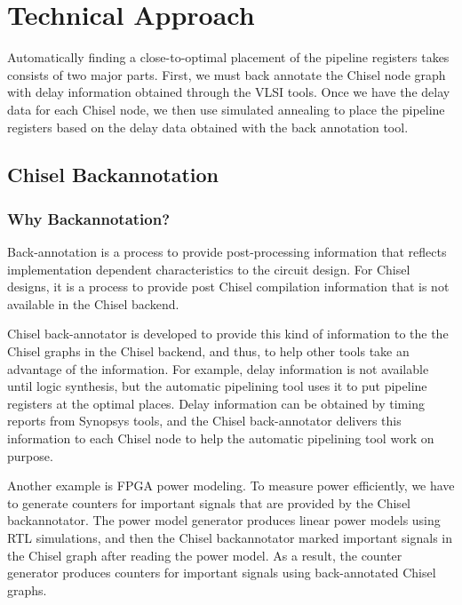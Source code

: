 \section{Technical Approach}
Automatically finding a close-to-optimal placement of the pipeline registers takes consists of two major parts. First, we must back annotate the Chisel node graph with delay information obtained through the VLSI tools. Once we have the delay data for each Chisel node, we then use simulated annealing to place the pipeline registers based on the delay data obtained with the back annotation tool.

\subsection{Chisel Backannotation}
\subsubsection{Why Backannotation?}
Back-annotation is a process to provide post-processing information that reflects implementation dependent characteristics to the circuit design. For Chisel designs, it is a process to provide post Chisel compilation information that is not available in the Chisel backend. 

Chisel back-annotator is developed to provide this kind of information to the the Chisel graphs in the Chisel backend, and thus, to help other tools take an advantage of the information. For example, delay information is not available until logic synthesis, but the automatic pipelining tool uses it to put pipeline registers at the optimal places. Delay information can be obtained by timing reports from Synopsys tools, and the Chisel back-annotator delivers this information to each Chisel node to help the automatic pipelining tool work on purpose. 

Another example is FPGA power modeling. To measure power efficiently, we have to generate counters for important signals that are provided by the Chisel backannotator. The power model generator produces linear power models using RTL simulations, and then the Chisel backannotator marked important signals in the Chisel graph after reading the power model. As a result, the counter generator produces counters for important signals using back-annotated Chisel graphs.

